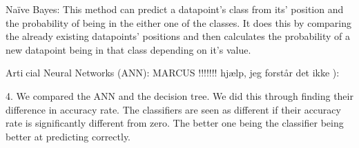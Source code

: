 \documentclass[english,a4paper,,tablecaptionabove]{scrartcl}
\begin{document}
Naïve Bayes:
This method can predict a datapoint's class from its' position and the probability
of being in the either one of the classes. It does this by comparing the already existing
datapoints' positions and then calculates the probability of a new datapoint being in that
class depending on it's value.


Articial Neural Networks (ANN):
MARCUS !!!!!!! hjælp, jeg forstår det ikke ):



4.
We compared the ANN and the decision tree. We did this through finding their difference in accuracy rate.
The classifiers are seen as different if their accuracy rate is significantly different from zero. The better one being
the classifier being better at predicting correctly.
\end{document}
